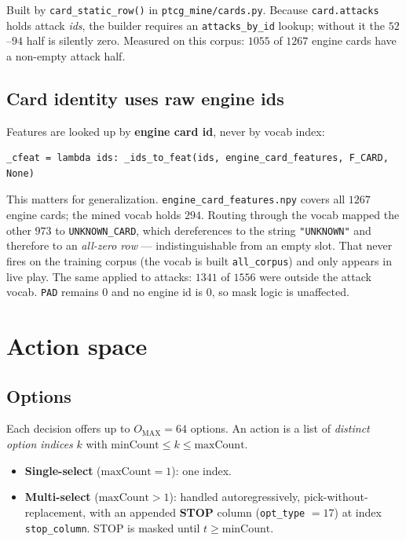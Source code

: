 \documentclass[11pt,a4paper]{article}
\newcommand{\code}[1]{\texttt{\small #1}}
\newcommand{\file}[1]{\texttt{\small #1}}
\begin{document}
\noindent
Built by \code{card\_static\_row()} in \file{ptcg\_mine/cards.py}. Because
\code{card.attacks} holds attack \emph{ids}, the builder requires an
\code{attacks\_by\_id} lookup; without it the $52$--$94$ half is silently zero.
Measured on this corpus: $1055$ of $1267$ engine cards have a non-empty attack
half.

\subsection{Card identity uses raw engine ids}

Features are looked up by \textbf{engine card id}, never by vocab index:

\begin{lstlisting}
_cfeat = lambda ids: _ids_to_feat(ids, engine_card_features, F_CARD, None)
\end{lstlisting}

\noindent
This matters for generalization. \code{engine\_card\_features.npy} covers all
$1267$ engine cards; the mined vocab holds $294$. Routing through the vocab
mapped the other $973$ to \code{UNKNOWN\_CARD}, which dereferences to the
string \code{"UNKNOWN"} and therefore to an \emph{all-zero row} ---
indistinguishable from an empty slot. That never fires on the training corpus
(the vocab is built \code{all\_corpus}) and only appears in live play.
The same applied to attacks: $1341$ of $1556$ were outside the attack vocab.
\code{PAD} remains $0$ and no engine id is $0$, so mask logic is unaffected.

\section{Action space}
\label{sec:action}

\subsection{Options}

Each decision offers up to $O_{\text{MAX}} = 64$ options. An action is a list
of \emph{distinct option indices} $k$ with
$\text{minCount} \le k \le \text{maxCount}$.

\begin{itemize}[leftmargin=*]
  \item \textbf{Single-select} ($\text{maxCount} = 1$): one index.
  \item \textbf{Multi-select} ($\text{maxCount} > 1$): handled
    autoregressively, pick-without-replacement, with an appended \textbf{STOP}
    column (\code{opt\_type} $= 17$) at index \code{stop\_column}. STOP is
    masked until $t \ge \text{minCount}$.
\end{itemize}
\end{document}
